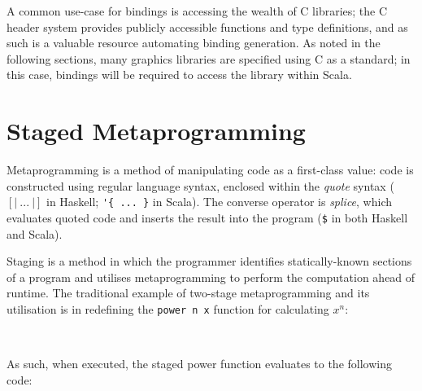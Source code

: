 \documentclass[12pt,twoside]{report}
\begin{document}
A common use-case for bindings is accessing the wealth of C libraries; the C header system provides publicly accessible functions and type definitions, and as such is a valuable resource automating binding generation. As noted in the following sections, many graphics libraries are specified using C as a standard; in this case, bindings will be required to access the library within Scala.


\section{Staged Metaprogramming} %

Metaprogramming is a method of manipulating code as a first-class value: code is constructed using regular language syntax, enclosed within the \textit{quote} syntax (\([|~...~|]\) in Haskell; \verb|'{ ... }| in Scala). The converse operator is \textit{splice}, which evaluates quoted code and inserts the result into the program (\verb|$| in both Haskell and Scala).


Staging is a method in which the programmer identifies statically-known sections of a program and utilises metaprogramming to perform the computation ahead of runtime. The traditional example of two-stage metaprogramming and its utilisation is in redefining the \verb|power n x| function for calculating \(x^n\):

\begin{minipage}{.5\textwidth}
  
\end{minipage}
~
\begin{minipage}{.5\textwidth}
  
\end{minipage}

As such, when executed, the staged power function evaluates to the following code:


\end{document}
